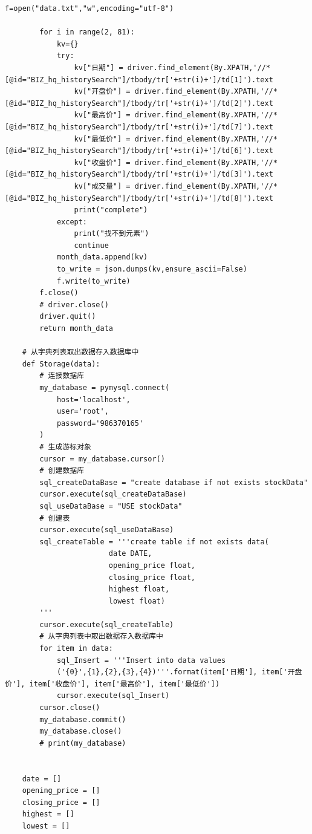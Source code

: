 \documentclass[UTF8,12pt]{article}
\begin{document}
\begin{lstlisting}[title=实验源码,frame=shadowbox]
        f=open("data.txt","w",encoding="utf-8")
    
        for i in range(2, 81):
            kv={}
            try:
                kv["日期"] = driver.find_element(By.XPATH,'//*[@id="BIZ_hq_historySearch"]/tbody/tr['+str(i)+']/td[1]').text
                kv["开盘价"] = driver.find_element(By.XPATH,'//*[@id="BIZ_hq_historySearch"]/tbody/tr['+str(i)+']/td[2]').text
                kv["最高价"] = driver.find_element(By.XPATH,'//*[@id="BIZ_hq_historySearch"]/tbody/tr['+str(i)+']/td[7]').text
                kv["最低价"] = driver.find_element(By.XPATH,'//*[@id="BIZ_hq_historySearch"]/tbody/tr['+str(i)+']/td[6]').text
                kv["收盘价"] = driver.find_element(By.XPATH,'//*[@id="BIZ_hq_historySearch"]/tbody/tr['+str(i)+']/td[3]').text
                kv["成交量"] = driver.find_element(By.XPATH,'//*[@id="BIZ_hq_historySearch"]/tbody/tr['+str(i)+']/td[8]').text
                print("complete")
            except:
                print("找不到元素")
                continue
            month_data.append(kv)
            to_write = json.dumps(kv,ensure_ascii=False)
            f.write(to_write)
        f.close()
        # driver.close()
        driver.quit()
        return month_data
    
    # 从字典列表取出数据存入数据库中
    def Storage(data):
        # 连接数据库
        my_database = pymysql.connect(
            host='localhost',
            user='root',
            password='986370165'
        )
        # 生成游标对象
        cursor = my_database.cursor()
        # 创建数据库
        sql_createDataBase = "create database if not exists stockData"
        cursor.execute(sql_createDataBase)
        sql_useDataBase = "USE stockData"
        # 创建表
        cursor.execute(sql_useDataBase)
        sql_createTable = '''create table if not exists data(
                        date DATE,
                        opening_price float,
                        closing_price float,
                        highest float,
                        lowest float)
        '''
        cursor.execute(sql_createTable)
        # 从字典列表中取出数据存入数据库中
        for item in data:
            sql_Insert = '''Insert into data values
            ('{0}',{1},{2},{3},{4})'''.format(item['日期'], item['开盘价'], item['收盘价'], item['最高价'], item['最低价'])
            cursor.execute(sql_Insert)
        cursor.close()
        my_database.commit()
        my_database.close()
        # print(my_database)
    
    
    date = []
    opening_price = []
    closing_price = []
    highest = []
    lowest = []
    

\end{lstlisting}
\end{document}
